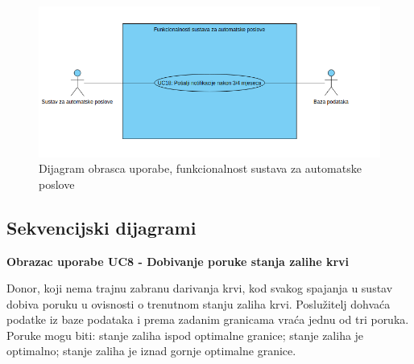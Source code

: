 \begin{figure}[H]
			\includegraphics[scale=0.6]{dijagrami/Funkcionalnosti_auto.png} %
			\centering
			\caption{Dijagram obrasca uporabe, funkcionalnost sustava za automatske poslove}
			\label{fig:Funkcionalnosti_auto}
\end{figure}

\eject
		
\subsection{Sekvencijski dijagrami}

\textbf{Obrazac uporabe UC8 - Dobivanje poruke stanja zalihe krvi}

Donor, koji nema trajnu zabranu darivanja krvi, kod svakog spajanja u sustav dobiva poruku u ovisnosti o trenutnom stanju zaliha krvi. Poslužitelj dohvaća podatke iz baze podataka i prema zadanim granicama vraća jednu od tri poruka. Poruke mogu biti: stanje zaliha ispod optimalne granice; stanje zaliha je optimalno; stanje zaliha je iznad gornje optimalne granice.

